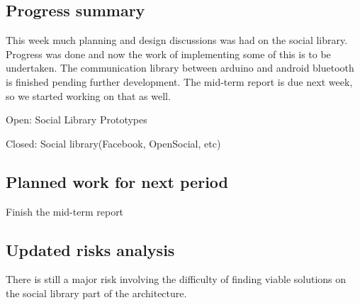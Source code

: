 \subsection{Progress summary}
This week much planning and design discussions was had on the social library. Progress was done 
and now the work of implementing some of this is to be undertaken. The communication library 
between arduino and android bluetooth is finished pending further development. The mid-term report is 
due next week, so we started working on that as well.

Open:
Social Library
Prototypes

Closed:
Social library(Facebook, OpenSocial, etc)


\subsection{Planned work for next period}
Finish the mid-term report


\subsection{Updated risks analysis}
There is still a major risk involving the difficulty of finding viable solutions on the social library part of the architecture.